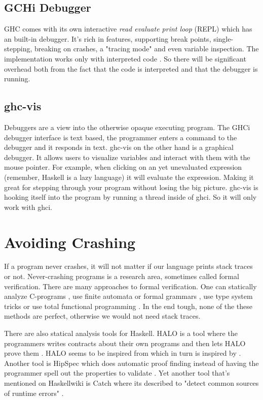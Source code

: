 \subsection{GCHi Debugger}

GHC comes with its own interactive \emph{read evaluate print loop} (REPL)
which has an built-in debugger. It's rich in features, supporting break
points, single-stepping, breaking on crashes, a "tracing mode" and even
variable inspection. The implementation works only with interpreted
code \cite{marlow2007lightweight, ghci_debugger}. So there will be significant overhead both
from the fact that the code is interpreted and that the debugger is
running.


\subsection{ghc-vis}

Debuggers are a view into the otherwise opaque executing program. The
GHCi debugger interface is text based, the programmer enters a command
to the debugger and it responds in text.  ghc-vis on the other hand is a
graphical debugger.  It allows users to visualize variables and interact
with them with the mouse pointer. For example, when clicking on an yet
unevaluated expression (remember, Haskell is a lazy language) it will
evaluate the expression.  Making it great for stepping through your
program without losing the big picture.  ghc-vis is hooking itself into
the program by running a thread inside of ghci. So it will only work
with ghci.  \cite{thesisFelsingBA}

\section{Avoiding Crashing} \label{sec:avoiding_crashing}

If a program never crashes,
it will not matter if our language prints stack traces or not. Never-crashing programs is a research area, sometimes called formal
verification. There are many approaches to formal verification. One
can statically analyze C-programs \cite{ckl2004},
use finite automata
or formal grammars \cite{dantam2013motion, rouhani2013software},
use type system tricks \cite{cheney2003first}
or use total functional programming \cite{Turner:jucs_10_7:total_functional_programming}.
In the end tough, none of the these methods are perfect, otherwise we
would not need stack traces.

There are also statical analysis tools for Haskell. HALO is a tool
where the programmers writes contracts about their own programs and
then lets HALO prove them \cite{vytiniotis2013halo}. HALO seems to
be inspired from \cite{xu2009static} which in turn is inspired by
\cite{xu2006extended}. Another tool is HipSpec which does automatic
proof finding instead of having the programmer spell out the properties
to validate \cite{claessen2013automating}. Yet another tool that's
mentioned on Haskellwiki is Catch where its described to "detect common
sources of runtime errors" \cite{haskellwiki_static_analysis_tools}.

